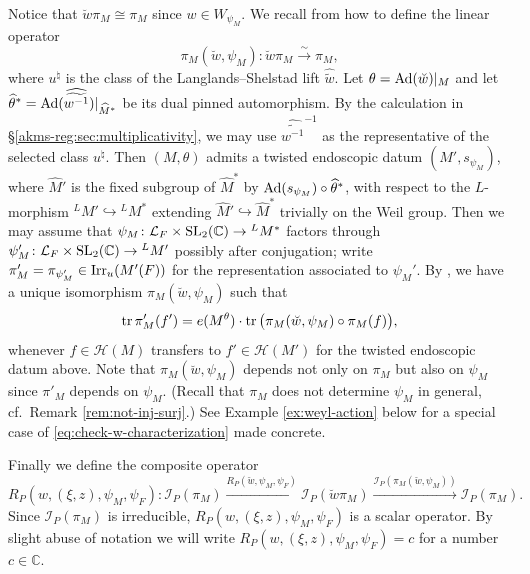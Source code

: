 \documentclass[11pt,reqno]{amsart}
\theoremstyle{plain}
\theoremstyle{definition}
\newcommand{\C}{\mathbb{C}}
\renewcommand{\cL}{\mathcal{L}}
\newcommand{\tr}{\tu{tr}\,}
\newcommand{\SL}{\tu{SL}}
\newcommand{\Ad}{\tu{Ad}}
\newcommand{\Irr}{\tu{Irr}}
\newcommand{\tu}{\textup}
\newcommand{\ra}{\rightarrow}
\newcommand{\isom}{\stackrel{\sim}{\ra}}
\renewcommand{\hat}{\widehat}
\numberwithin{equation}{subsection}
\begin{document}
Notice that $\breve{w}\pi_M \cong \pi_M$ since $w \in W_{\psi_M}$.
We recall from \cite[\S2.4.3]{KMSW} how to define the linear operator 
\[
\pi_M(\breve{w},\psi_M)\colon  \breve{w}\pi_M\isom \pi_M,
\]
where $u^\natural$ is the class of the Langlands--Shelstad lift $\widehat{\tilde w}$. Let $\theta=\Ad(\breve w)|_M$ and let
$\hat\theta^*=\Ad(\widehat{\widetilde{w^{-1}}})|_{\hat M^*}$ be its
dual pinned automorphism. By the calculation in
\S\ref{akms-reg:sec:multiplicativity}, we may use
$\widehat{\widetilde{w^{-1}}}^{-1}$ as the representative of the
selected class $u^\natural$.
Then $(M,\theta)$ admits a twisted endoscopic datum $(M',s_{\psi_M})$, 
where $\hat M'$ is the fixed subgroup of $\hat M^*$ by $\Ad(s_{\psi_M})\circ  \hat \theta^*$, with respect to the $L$-morphism $^L M' \hookrightarrow {}^L M^*$ extending $\hat M'\hookrightarrow \hat M^*$ trivially on the Weil group. Then we may assume that $\psi_M\colon \cL_F\times \SL_2(\C)\to {}^L M^*$ factors through $\psi'_M\colon \cL_F\times \SL_2(\C)\to {}^L M'$ possibly after conjugation; write $\pi'_M = \pi_{\psi_M'}\in \Irr_u(M'(F))$ for 
the representation associated to $\psi_M'$.
By \cite[Lem.~2.4.1]{KMSW}, we have a unique isomorphism
$\pi_M(\breve{w},\psi_M)$ such that 
\begin{equation}\label{eq:check-w-characterization}
   \tr \pi'_M(f')=e(M^\theta)\cdot \tr\big(\pi_M(\breve{w},\psi_M)\circ \pi_M(f)\big), 
\end{equation}
whenever $f\in \mathcal H(M)$ transfers to $f'\in \mathcal H(M')$ for the twisted endoscopic datum above. 
Note that $\pi_M(\breve{w},\psi_M)$ depends not only on $\pi_M$ but also on $\psi_M$ since $\pi'_M$ depends on $\psi_M$. (Recall that $\pi_M$ does not determine $\psi_M$ in general, cf.~Remark \ref{rem:not-inj-surj}.)
See Example \ref{ex:weyl-action} below for a special case of \eqref{eq:check-w-characterization} made concrete. 

Finally we define the composite operator
\begin{equation}\label{eq:RP(w)}
    R_P(w, (\xi,z), \psi_{M}, \psi_F)\colon   
\mathcal{I}_P(\pi_{M}) \xrightarrow{R_P(\breve{w},\psi_{M}, \psi_F)} \mathcal{I}_{P}(\breve{w}\pi_{M})\xrightarrow{\mathcal{I}_P(\pi_M(\breve{w},\psi_M))}  \mathcal{I}_P(\pi_{M}).
\end{equation}
Since $\mathcal{I}_P(\pi_{M})$ is irreducible, $R_P(w, (\xi,z), \psi_{M}, \psi_F)$ is a scalar operator. By slight abuse of notation we will write $R_P(w, (\xi,z), \psi_{M}, \psi_F)=c$ for a number $c\in \C$.
\end{document}
